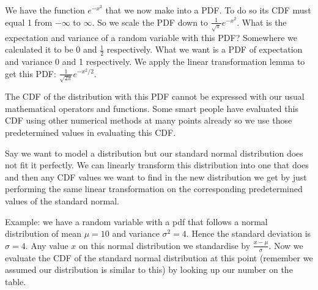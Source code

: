 \documentclass{article}
\begin{document}
			We have the function $e^{-x^2}$ that we now make into a PDF. To do so its CDF must equal 1 from $-\infty$ to $\infty$. So we scale the PDF down to $\frac{1}{\sqrt{\pi}}e^{-x^2}$. What is the expectation and variance of a random variable with this PDF? Somewhere we calculated it to be 0 and $\frac{1}{2}$ respectively. What we want is a PDF of expectation and variance 0 and 1 respectively. We apply the linear transformation lemma to get this PDF: $\frac{1}{\sqrt{2\pi}}e^{-x^2/2}$.
		
			The CDF of the distribution with this PDF cannot be expressed with our usual mathematical operators and functions. Some smart people have evaluated this CDF using other numerical methods at many points already so we use those predetermined values in evaluating this CDF.
		
			Say we want to model a distribution but our standard normal distribution does not fit it perfectly. We can linearly transform this distribution into one that does and then any CDF values we want to find in the new distribution we get by just performing the same linear transformation on the corresponding predetermined values of the standard normal.
		
			Example: we have a random variable with a pdf that follows a normal distribution of mean $\mu=10$ and variance $\sigma^2=4$. Hence the standard deviation is $\sigma=4$. Any value $x$ on this normal distribution we standardise by $\frac{x-\mu}{\sigma}$. Now we evaluate the CDF of the standard normal distribution at this point (remember we assumed our distribution is similar to this) by looking up our number on the table. \\
			
\end{document}
